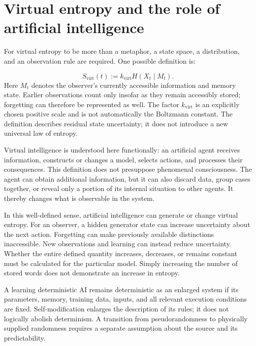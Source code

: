 \section{Virtual entropy and the role of artificial intelligence}\label{en:sec4}
For virtual entropy to be more than a metaphor, a state space, a distribution, and an observation rule are required. One possible definition is:

\begin{equation}\label{en:eq4}
S_{\mathrm{virt}}(t):=k_{\mathrm{virt}}H(X_t\mid M_t).
\end{equation}
Here \(M_t\) denotes the observer's currently accessible information and memory state. Earlier observations count only insofar as they remain accessibly stored; forgetting can therefore be represented as well. The factor \(k_{\mathrm{virt}}\) is an explicitly chosen positive scale and is not automatically the Boltzmann constant. The definition describes residual state uncertainty; it does not introduce a new universal law of entropy.

Virtual intelligence is understood here functionally: an artificial agent receives information, constructs or changes a model, selects actions, and processes their consequences. This definition does not presuppose phenomenal consciousness. The agent can obtain additional information, but it can also discard data, group cases together, or reveal only a portion of its internal situation to other agents. It thereby changes what is observable in the system.

In this well-defined sense, artificial intelligence can generate or change virtual entropy. For an observer, a hidden generator state can increase uncertainty about the next action. Forgetting can make previously available distinctions inaccessible. New observations and learning can instead reduce uncertainty. Whether the entire defined quantity increases, decreases, or remains constant must be calculated for the particular model. Simply increasing the number of stored words does not demonstrate an increase in entropy.

A learning deterministic AI remains deterministic as an enlarged system if its parameters, memory, training data, inputs, and all relevant execution conditions are fixed. Self-modification enlarges the description of its rules; it does not logically abolish determinism. A transition from pseudorandomness to physically supplied randomness requires a separate assumption about the source and its predictability.

